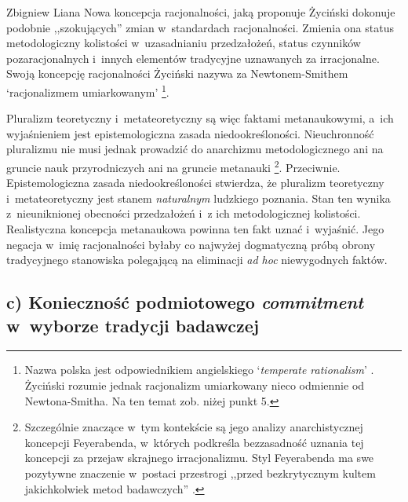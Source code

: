 \begin{artplenv}{Zbigniew Liana}
Nowa koncepcja racjonalności, jaką proponuje Życiński dokonuje podobnie ,,szokujących'' zmian w~standardach racjonalności. Zmienia ona status metodologiczny kolistości w~uzasadnianiu przedzałożeń, status czynników pozaracjonalnych i~innych elementów tradycyjne uznawanych za irracjonalne. Swoją koncepcję racjonalności Życiński nazywa za Newtonem-Smithem ‘racjonalizmem umiarkowanym'
\parencite[][s.~205]{zycinski_teizm_1985}%
\footnote{Nazwa polska jest odpowiednikiem angielskiego `\textit{temperate rationalism}' 
\parencite[][s.~266–273]{newton-smith_rationality_1981}. %
 Życiński rozumie jednak racjonalizm umiarkowany nieco odmiennie od Newtona-Smitha. Na ten temat zob. niżej punkt 5.}.

Pluralizm teoretyczny i~metateoretyczny są więc faktami metanaukowymi, a~ich wyjaśnieniem jest epistemologiczna zasada niedookreśloności. Nieuchronność pluralizmu nie musi jednak prowadzić do anarchizmu metodologicznego ani na gruncie nauk przyrodniczych ani na gruncie metanauki
\parencites[zob. np.][s.~183nn]{zycinski_jezyk_1983}[][s.~161n.203nn]{zycinski_teizm_1985}%
\footnote{Szczególnie znaczące w~tym kontekście są jego analizy anarchistycznej koncepcji Feyerabenda, w~których podkreśla bezzasadność uznania tej koncepcji za przejaw skrajnego irracjonalizmu. Styl Feyerabenda ma swe pozytywne znaczenie w~postaci przestrogi ,,przed bezkrytycznym kultem jakichkolwiek metod badawczych'' 
\parencites[zob.][s.~217–227, zwł. s.~220]{zycinski_elementy_1996}[][s.~295–308, zwł. s.~299n]{zycinski_elementy_2015}.%
}. Przeciwnie. Epistemologiczna zasada niedookreśloności stwierdza, że pluralizm teoretyczny i~metateoretyczny jest stanem \textit{naturalnym} ludzkiego poznania. Stan ten wynika z~nieuniknionej obecności przedzałożeń i~z ich metodologicznej kolistości. Realistyczna koncepcja metanaukowa powinna ten fakt uznać i~wyjaśnić. Jego negacja w~imię racjonalności byłaby co najwyżej dogmatyczną próbą obrony tradycyjnego stanowiska polegającą na eliminacji \textit{ad hoc} niewygodnych faktów.

\subsection{c) Konieczność podmiotowego \textit{commitment} w~wyborze tradycji badawczej}


\end{artplenv}

